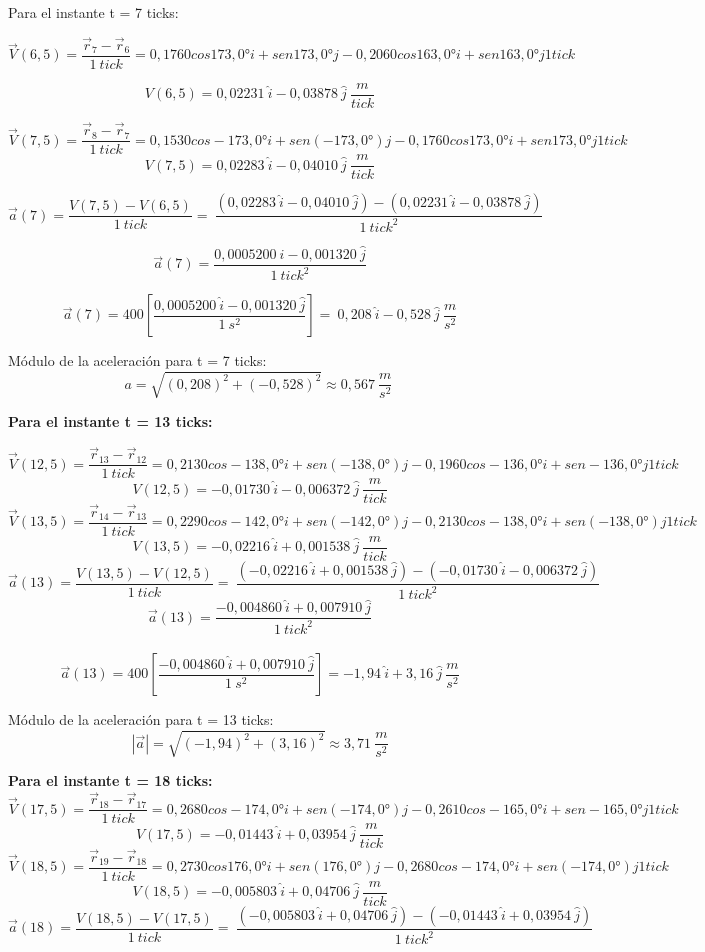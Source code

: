 \documentclass[../main.tex]{subfiles}
\begin{document}
Para el instante t = 7 ticks:

\[\vec{V}\left(6,5\right)=\frac{{\vec{r}}_7-{\vec{r}}_6}{1\ tick}=0,1760cos173,0°i+sen173,0° j-0,2060cos163,0°i+sen163,0° j1 tick\]

\[V\left(6,5\right)=0,02231\ \hat{i}-0,03878\ \hat{j}\ \frac{m}{tick}\]

\[\vec{V}\left(7,5\right)=\frac{{\vec{r}}_8-{\vec{r}}_7}{1\ tick}=0,1530cos-173,0°i+sen(-173,0°)j-0,1760cos173,0°i+sen173,0°j1 tick\]
\[V\left(7,5\right)=0,02283\ \hat{i}-0,04010\ \hat{j}\ \frac{m}{tick}\]

\[\vec{a}\left(7\right)=\frac{V\left(7,5\right)-V\left(6,5\right)}{1\ tick}=\ \frac{\left(0,02283\ \hat{i}-0,04010\ \hat{j}\right)-\left(0,02231\ \hat{i}-0,03878\ \hat{j}\right)}{1\ {tick}^2}\]

\[\vec{a}\left(7\right)=\frac{0,0005200\ \hat{i}-0,001320\ \hat{j}}{1\ {tick}^2}\]

\[\vec{a}\left(7\right)=400\left[\frac{0,0005200\ \hat{i}-0,001320\ \hat{j}}{1\ s^2}\right]=\ 0,208\ \hat{i}-0,528\ \hat{j}\ \frac{m}{s^2}\]


Módulo de la aceleración para t = 7 ticks:
\[a=\sqrt{\left(0,208\right)^2+\left(-0,528\right)^2}\approx0,567\ \frac{m}{s^2}\ \]

\textbf{Para el instante t = 13 ticks:}

\[\vec{V}\left(12,5\right)=\frac{{\vec{r}}_{13}-{\vec{r}}_{12}}{1\ tick}=0,2130cos-138,0°i+sen(-138,0°)j-0,1960cos-136,0°i+sen-136,0° j1 tick\]
\[V\left(12,5\right)=-0,01730\ \hat{i}-0,006372\ \hat{j}\ \frac{m}{tick}\]
\[\vec{V}\left(13,5\right)=\frac{{\vec{r}}_{14}-{\vec{r}}_{13}}{1\ tick}=0,2290cos-142,0°i+sen(-142,0°)j-0,2130cos-138,0°i+sen(-138,0°)j1 tick\]
\[V\left(13,5\right)=-0,02216\ \hat{i}+0,001538\ \hat{j}\ \frac{m}{tick}\]
\[\vec{a}\left(13\right)=\frac{V\left(13,5\right)-V\left(12,5\right)}{1\ tick}=\ \frac{\left(-0,02216\ \hat{i}+0,001538\ \hat{j}\right)-\left(-0,01730\ \hat{i}-0,006372\ \hat{j}\right)}{1\ {tick}^2}\]
\[\vec{a}\left(13\right)=\frac{-0,004860\ \hat{i}+0,007910\ \hat{j}}{1\ {tick}^2}\]\
\[\vec{a}\left(13\right)=400\left[\frac{-0,004860\ \hat{i}+0,007910\ \hat{j}}{1\ s^2}\right]=-1,94\ \hat{i}+3,16\ \hat{j}\ \frac{m}{s^2}\]

Módulo de la aceleración para t = 13 ticks:
\[\left|\vec{a}\right|=\sqrt{\left(-1,94\right)^2+\left(3,16\right)^2}\approx3,71\ \frac{m}{s^2}\]

\textbf{Para el instante t = 18 ticks:}
\[\vec{V}\left(17,5\right)=\frac{{\vec{r}}_{18}-{\vec{r}}_{17}}{1\ tick}=0,2680cos-174,0°i+sen(-174,0°)j-0,2610cos-165,0°i+sen-165,0° j1 tick\]
\[V\left(17,5\right)=-0,01443\ \hat{i}+0,03954\ \hat{j}\ \frac{m}{tick}\]
\[\vec{V}\left(18,5\right)=\frac{{\vec{r}}_{19}-{\vec{r}}_{18}}{1\ tick}=0,2730cos176,0°i+sen(176,0°)j-0,2680cos-174,0°i+sen(-174,0°)j1 tick\]
\[V\left(18,5\right)=-0,005803\ \hat{i}+0,04706\ \hat{j}\ \frac{m}{tick}\]
\[\vec{a}\left(18\right)=\frac{V\left(18,5\right)-V\left(17,5\right)}{1\ tick}=\ \frac{\left(-0,005803\ \hat{i}+0,04706\ \hat{j}\right)-\left(-0,01443\ \hat{i}+0,03954\ \hat{j}\right)}{1\ {tick}^2}\]
\end{document}
